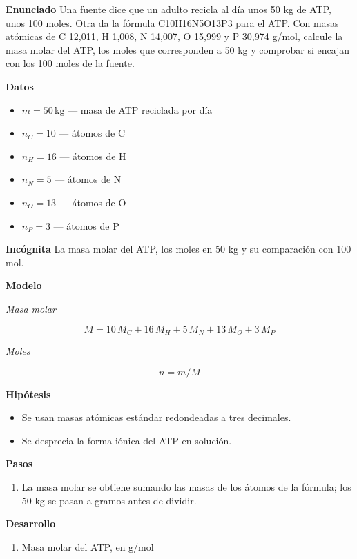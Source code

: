 \documentclass{book}
\begin{document}
\begin{tcolorbox}[title={Problema resuelto}, studiumworked, breakable]

\noindent\textbf{Enunciado}
Una fuente dice que un adulto recicla al día unos 50 kg de ATP, unos 100 moles. Otra da la fórmula C10H16N5O13P3 para el ATP. Con masas atómicas de C 12,011, H 1,008, N 14,007, O 15,999 y P 30,974 g/mol, calcule la masa molar del ATP, los moles que corresponden a 50 kg y comprobar si encajan con los 100 moles de la fuente.


\noindent\textbf{Datos}
\begin{itemize}
\item $m = 50\,\mathrm{kg}$ — masa de ATP reciclada por día
\item $n_{C} = 10$ — átomos de C
\item $n_{H} = 16$ — átomos de H
\item $n_{N} = 5$ — átomos de N
\item $n_{O} = 13$ — átomos de O
\item $n_{P} = 3$ — átomos de P
\end{itemize}

\noindent\textbf{Incógnita}
La masa molar del ATP, los moles en 50 kg y su comparación con 100 mol.


\noindent\textbf{Modelo}

\noindent\textit{Masa molar}

\[
M = 10\,M_C + 16\,M_H + 5\,M_N + 13\,M_O + 3\,M_P
\]

\noindent\textit{Moles}

\[
n = m / M
\]

\noindent\textbf{Hipótesis}
\begin{itemize}
\item Se usan masas atómicas estándar redondeadas a tres decimales.
\item Se desprecia la forma iónica del ATP en solución.
\end{itemize}

\noindent\textbf{Pasos}
\begin{enumerate}
\item
La masa molar se obtiene sumando las masas de los átomos de la fórmula; los 50 kg se pasan a gramos antes de dividir.

\end{enumerate}

\noindent\textbf{Desarrollo}
\begin{enumerate}
\item
Masa molar del ATP, en g/mol



\end{enumerate}
\end{tcolorbox}
\end{document}

